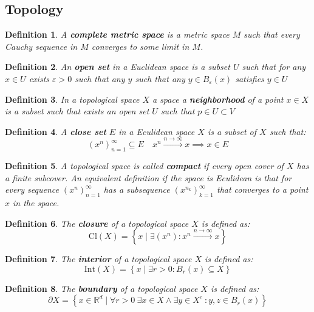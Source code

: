 \documentclass[11pt,a4paper]{article}
\theoremstyle{plain}
\newtheorem{definition}{Definition}[section]
\newcommand{\R}{\mathbb{R}}
\newcommand{\set}[2]{ \left\{ #1 \mid #2 \right\} }
\begin{document}
	\newpage
	
	\subsection{Topology}
	\begin{definition}
	A \textbf{complete metric space} is a metric space $M$ such that every
	Cauchy sequence in $M$ converges to some limit in $M$.
	\end{definition}
	\begin{definition}
	An \textbf{open set} in a Euclidean space is a subset $U$ such that
	for any $x \in U$ exists $\varepsilon > 0$ such that any $y$ such that
	any $y \in B_\varepsilon(x)$ satisfies $y\in U$
	\end{definition}
	\begin{definition}
	In a topological space $X$ a space a \textbf{neighborhood} of a point 
	$x\in X$ is a subset such that exists an open set $U$ such that 
	$p\in U\subset V$
	\end{definition}
	\begin{definition}
	A \textbf{close set} $E$ in a Eculidean space $X$ is a subset of $X$ such
	that:
	\[
		(x^n)_{n=1}^{\infty}\subseteq E \quad x^n \xrightarrow{n\to\infty} x
		\implies x \in E
	\]
	\end{definition}
	\begin{definition}
	A topological space is called \textbf{compact} if every open cover of 
	$X$ has a finite subcover. An equivalent definition if the space is
	Eculidean is that for every sequence $(x^n)_{n=1}^{\infty}$ has
	a subsequence $(x^{n_k})_{k=1}^{\infty}$ that converges to a point
	$x$ in the space.
	\end{definition}
	\begin{definition}
	The \textbf{closure} of a topological space $X$ is defined as:
	\[
		\mathrm{Cl}(X) = \set{x}{\exists (x^n) \colon 
		x^n \xrightarrow{n\to\infty} x}
	\]
	\end{definition}
	\begin{definition}
	The \textbf{interior} of a topological space $X$ is defined as:
	\[
		\mathrm{Int}(X) = \set{x}{\exists r > 0 \colon B_r(x) \subseteq X}
	\]
	\end{definition}
	\begin{definition}
	The \textbf{boundary} of a topological space $X$ is defined as:
	\[
		\partial X = \set{x\in\R^d}{\forall r > 0\
		\exists x \in X \land \exists y \in X^c\ : y,z\in B_r(x)}
	\]
	\end{definition}
\end{document}
